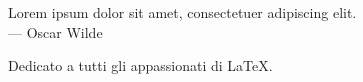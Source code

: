 
\cleardoublepage
{}
\thispagestyle{empty}

\vspace*{3cm}

\begin{center}
Lorem ipsum dolor sit amet, consectetuer adipiscing elit. \\ \medskip
--- Oscar Wilde    
\end{center}

\medskip

\begin{center}
Dedicato a tutti gli appassionati di \LaTeX.
\end{center}
